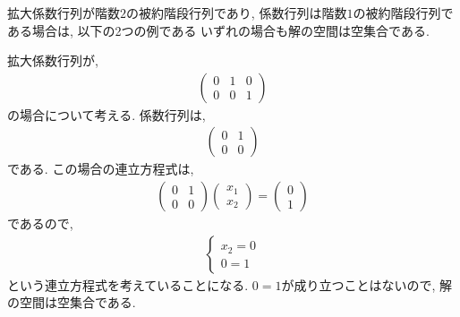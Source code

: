 拡大係数行列が階数$2$の被約階段行列であり,
係数行列は階数$1$の被約階段行列である場合は,
以下の2つの例である
いずれの場合も解の空間は空集合である.
\begin{example}
    \label{eg:eq:reduced:3}
  拡大係数行列が,
  \begin{align*}
    \begin{pmatrix}
      0&1&0\\0&0&1
    \end{pmatrix}
  \end{align*}
  の場合について考える.
  係数行列は,
  \begin{align*}
    \begin{pmatrix}
      0&1\\0&0
    \end{pmatrix}
  \end{align*}
  である.
  この場合の連立方程式は,
  \begin{align*}
    \begin{pmatrix}
      0&1\\0&0
    \end{pmatrix}
    \begin{pmatrix}x_1\\x_2\end{pmatrix}
      =
      \begin{pmatrix}
        0\\1
      \end{pmatrix}
  \end{align*}
  であるので,
  \begin{align*}
    \begin{cases}
      x_2=0\\
      0=1
    \end{cases}
  \end{align*}
  という連立方程式を考えていることになる.
  $0=1$が成り立つことはないので,
  解の空間は空集合である.
\end{example}
